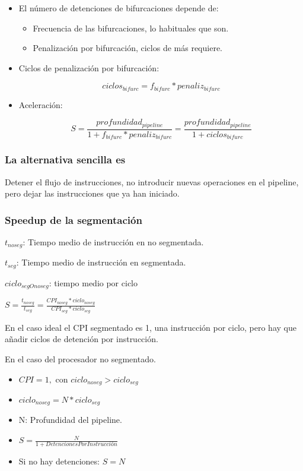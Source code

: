 \documentclass[12pt, twoside, openright]{report} %
\begin{document}
\begin{itemize}
\begin{itemize}
	      \end{itemize}

	\item El número de detenciones de bifurcaciones depende de:
	      \begin{itemize}
		      \item Frecuencia de las bifurcaciones, lo habituales que son.
		      \item Penalización por bifurcación, ciclos de más requiere.
	      \end{itemize}

	\item Ciclos de penalización por bifurcación:

	      $$ciclos_{bifurc} = f_{bifurc}*penaliz_{bifurc}$$
	\item Aceleración:

	      $$S= \frac {profundidad_{pipeline}} {1+ f_{bifurc}*penaliz_{bifurc}} = \frac {profundidad_{pipeline}} {1+ ciclos_{bifurc}}$$
\end{itemize}


\subsubsection{La alternativa sencilla es}
Detener el flujo de instrucciones, no introducir nuevas operaciones en el pipeline, pero dejar las instrucciones que ya han iniciado.
\subsubsection{Speedup de la segmentación}
$t_{noseg}$: Tiempo medio de instrucción en no segmentada.

$t_{seg}$: Tiempo medio de instrucción en segmentada.

$ciclo_{segOnoseg}$: tiempo medio por ciclo

$S= \frac { t_{noseg}} { t_{seg}} = \frac { CPI_{noseg} * ciclo_{noseg}} { CPI_{seg} * ciclo_{seg}}$

En el caso ideal el CPI segmentado es 1, una instrucción por ciclo, pero hay que añadir ciclos de detención por instrucción.

En el caso del procesador no segmentado.
\begin{itemize}
	\item $CPI=1,$ con $ciclo_{noseg} > ciclo_{seg}$
	\item $ciclo_{noseg} = N* ciclo_{seg}$
	\item N: Profundidad del pipeline.
	\item $S= \frac {N} { 1+ DetencionesPorInstrucción}$
	\item Si no hay detenciones: $S=N$
\end{itemize}
\end{document}
